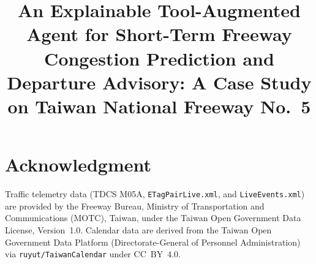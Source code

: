\documentclass[conference]{IEEEtran}
\begin{document}
\title{An Explainable Tool-Augmented Agent for Short-Term Freeway Congestion Prediction and Departure Advisory: A Case Study on Taiwan National Freeway No.~5}

\author{
}

\maketitle








\section*{Acknowledgment}
Traffic telemetry data (TDCS M05A, \texttt{ETagPairLive.xml}, and \texttt{LiveEvents.xml}) are provided by the Freeway Bureau, Ministry of Transportation and Communications (MOTC), Taiwan, under the Taiwan Open Government Data License, Version~1.0. Calendar data are derived from the Taiwan Open Government Data Platform (Directorate-General of Personnel Administration) via \texttt{ruyut/TaiwanCalendar} under CC~BY~4.0.



\end{document}
